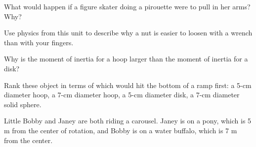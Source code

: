 \documentclass[10pt]{exam}
\begin{document}
\begin{questions}
\question
	What would happen if a figure skater doing a pirouette were to pull in her arms?  Why? \vs

\question
	Use physics from this unit to describe why a nut is easier to loosen with a wrench than with your fingers. \vs

\question
	Why is the moment of inertia for a hoop larger than the moment of inertia for a disk? \vs

\pagebreak

\question
	Rank these object in terms of which would hit the bottom of a ramp first: a 5-cm diameter hoop, a 7-cm diameter hoop, a 5-cm diameter disk, a 7-cm diameter solid sphere.
  \vspace{10em}

\question
	Little Bobby and Janey are both riding a carousel.  Janey is on a pony, which is 5 m from the center of rotation, and Bobby is on a water buffalo, which is 7 m from the center. 

  \begin{multicols}{2}



    \begin{flushright}
    \end{flushright}


\end{multicols}
\end{questions}
\end{document}
